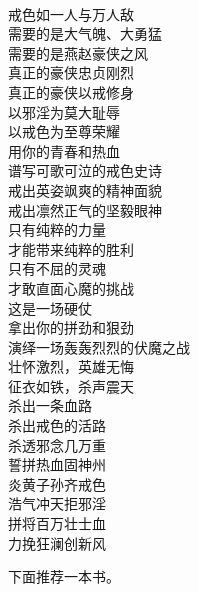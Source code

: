 \begin{poem}[杀出重围]
    \begin{multicols}{2}
        \centering~\\
        戒色如一人与万人敌 \\ 需要的是大气魄、大勇猛 \\ 需要的是燕赵豪侠之风 \\ 真正的豪侠忠贞刚烈 \\ 真正的豪侠以戒修身 \\ 以邪淫为莫大耻辱 \\ 以戒色为至尊荣耀 \\ 用你的青春和热血 \\ 谱写可歌可泣的戒色史诗 \\ 戒出英姿飒爽的精神面貌 \\ 戒出凛然正气的坚毅眼神 \\ 只有纯粹的力量 \\ 才能带来纯粹的胜利 \\ 只有不屈的灵魂 \\ 才敢直面心魔的挑战 \\ 这是一场硬仗 \\ 拿出你的拼劲和狠劲 \\ 演绎一场轰轰烈烈的伏魔之战 \\ 壮怀激烈，英雄无悔 \\ 征衣如铁，杀声震天 \\ 杀出一条血路 \\ 杀出戒色的活路 \\ 杀透邪念几万重 \\ 誓拼热血固神州 \\ 炎黄子孙齐戒色 \\ 浩气冲天拒邪淫 \\ 拼将百万壮士血 \\ 力挽狂澜创新风
    \end{multicols}
\end{poem}

下面推荐一本书。

